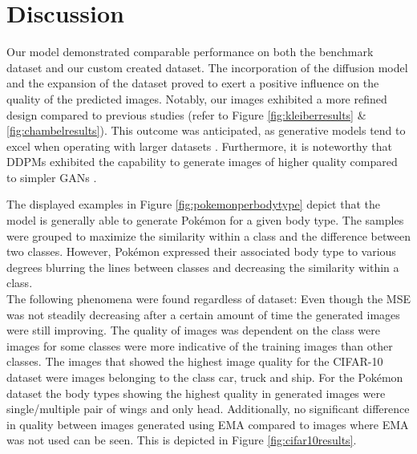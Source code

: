 \documentclass[12pt]{article}
\theoremstyle{plain}
\theoremstyle{definition}
\theoremstyle{remark}
\begin{document}
\section{Discussion}
\label{sec:discussion}
Our model demonstrated comparable performance on both the benchmark dataset and our custom created dataset. The incorporation of the diffusion model and the expansion of the dataset proved to exert a positive influence on the quality of the predicted images. Notably, our images exhibited a more refined design compared to previous studies (refer to Figure \ref{fig:kleiberresults} \& \ref{fig:chambelresults}). This outcome was anticipated, as generative models tend to excel when operating with larger datasets \citep{Yang2023}. Furthermore, it is noteworthy that \ac{DDPM}s exhibited the capability to generate images of higher quality compared to simpler \ac{GAN}s \citep{Guarnera2023}.

The displayed examples in Figure \ref{fig:pokemonperbodytype} depict that the model is generally able to generate Pokémon for a given body type. The samples were grouped to maximize the similarity within a class and the difference between two classes. However, Pokémon expressed their associated body type to various degrees blurring the lines between classes and decreasing the similarity within a class. \\
The following phenomena were found regardless of dataset: Even though the \ac{MSE} was not steadily decreasing after a certain amount of time the generated images were still improving. The quality of images was dependent on the class were images for some classes were more indicative of the training images than other classes. The images that showed the highest image quality for the \ac{CIFAR-10} dataset were images belonging to the class car, truck and ship. For the Pokémon dataset the body types showing the highest quality in generated images were single/multiple pair of wings and only head. Additionally, no significant difference in quality between images generated using \ac{EMA} compared to images where \ac{EMA} was not used can be seen. This is depicted in Figure \ref{fig:cifar10results}.
\end{document}
